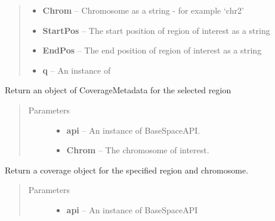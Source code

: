 \documentclass[letterpaper,10pt,english]{sphinxmanual}
\begin{document}
\begin{fulllineitems}
\begin{fulllineitems}
\begin{quote}
\begin{description}
\begin{itemize}
\item {} 
\textbf{Chrom} -- Chromosome as a string - for example `chr2'

\item {} 
\textbf{StartPos} -- The start position of region of interest as a string

\item {} 
\textbf{EndPos} -- The end position of region of interest as a string

\item {} 
\textbf{q} -- An instance of

\end{itemize}

\end{description}\end{quote}

\end{fulllineitems}


\begin{fulllineitems}
\label{Available modules:BaseSpacePy.model.File.File.getCoverageMeta}
Return an object of CoverageMetadata for the selected region
\begin{quote}\begin{description}
\item[{Parameters}] \leavevmode\begin{itemize}
\item {} 
\textbf{api} -- An instance of BaseSpaceAPI.

\item {} 
\textbf{Chrom} -- The chromosome of interest.

\end{itemize}

\end{description}\end{quote}

\end{fulllineitems}


\begin{fulllineitems}
\label{Available modules:BaseSpacePy.model.File.File.getIntervalCoverage}
Return a coverage object for the specified region and chromosome.
\begin{quote}\begin{description}
\item[{Parameters}] \leavevmode\begin{itemize}
\item {} 
\textbf{api} -- An instance of BaseSpaceAPI


\end{itemize}
\end{description}
\end{quote}
\end{fulllineitems}
\end{fulllineitems}
\end{document}
